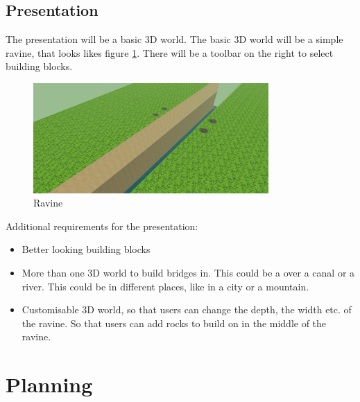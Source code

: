 \documentclass[10pt]{article}
\begin{document}
\subsection{Presentation}
The presentation will be a basic 3D world. The basic 3D world will be a simple ravine, that looks likes figure \ref{fig:rav}. There will be a toolbar on the right to select building blocks.
\begin{figure}[H]
    \centering
    \includegraphics[width=0.8\textwidth]{pics/Ravine.png}
    \caption{Ravine}
    \label{fig:rav}
\end{figure}
 Additional requirements for the presentation:
 \begin{itemize}
 \item Better looking building blocks
 \item More than one 3D world to build bridges in. This could be a over a canal or a river. This could be in different places, like in a city or a mountain.
 \item Customisable 3D world, so that users can change the depth, the width etc. of the ravine. So that users can add rocks to build on in the middle of the ravine.
 \end{itemize}

\section{Planning}
\end{document}
